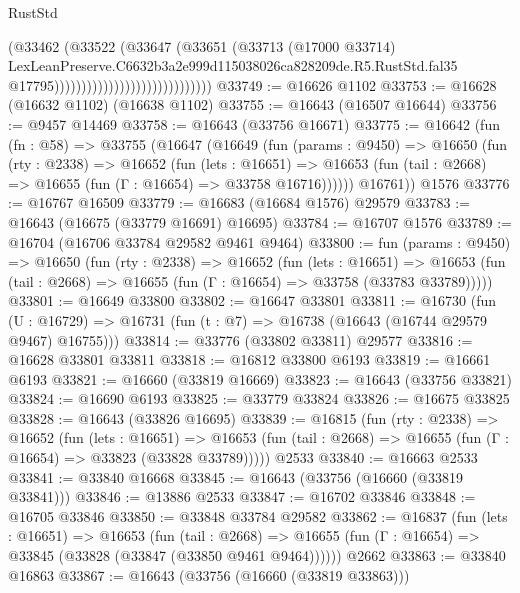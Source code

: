 \begin{lexlean}{RustStd}
\begin{coremodule}
                                                    (@33462
                                                      (@33522
                                                        (@33647
                                                          (@33651
                                                            (@33713
                                                              (@17000 @33714)
                                                              LexLeanPreserve.C6632b3a2e999d115038026ca828209de.R5.RustStd.fal35
                                                              @17795)))))))))))))))))))))))))))))
@33749 := @16626 @1102
@33753 := @16628 (@16632 @1102) (@16638 @1102)
@33755 := @16643 (@16507 @16644)
@33756 := @9457 @14469
@33758 := @16643 (@33756 @16671)
@33775 := @16642
    (fun (fn : @58) =>
    @33755
      (@16647
        (@16649
          (fun (params : @9450) =>
          @16650
            (fun (rty : @2338) =>
            @16652
              (fun (lets : @16651) =>
              @16653 (fun (tail : @2668) => @16655 (fun (Γ : @16654) => @33758 @16716))))))
        @16761))
    @1576
@33776 := @16767 @16509
@33779 := @16683 (@16684 @1576) @29579
@33783 := @16643 (@16675 (@33779 @16691) @16695)
@33784 := @16707 @1576
@33789 := @16704 (@16706 @33784 @29582 @9461 @9464)
@33800 := fun (params : @9450) =>
  @16650
    (fun (rty : @2338) =>
    @16652
      (fun (lets : @16651) =>
      @16653 (fun (tail : @2668) => @16655 (fun (Γ : @16654) => @33758 (@33783 @33789)))))
@33801 := @16649 @33800
@33802 := @16647 @33801
@33811 := @16730
    (fun (U : @16729) => @16731 (fun (t : @7) => @16738 (@16643 (@16744 @29579 @9467) @16755)))
@33814 := @33776 (@33802 @33811) @29577
@33816 := @16628 @33801 @33811
@33818 := @16812 @33800 @6193
@33819 := @16661 @6193
@33821 := @16660 (@33819 @16669)
@33823 := @16643 (@33756 @33821)
@33824 := @16690 @6193
@33825 := @33779 @33824
@33826 := @16675 @33825
@33828 := @16643 (@33826 @16695)
@33839 := @16815
    (fun (rty : @2338) =>
    @16652
      (fun (lets : @16651) =>
      @16653 (fun (tail : @2668) => @16655 (fun (Γ : @16654) => @33823 (@33828 @33789)))))
    @2533
@33840 := @16663 @2533
@33841 := @33840 @16668
@33845 := @16643 (@33756 (@16660 (@33819 @33841)))
@33846 := @13886 @2533
@33847 := @16702 @33846
@33848 := @16705 @33846
@33850 := @33848 @33784 @29582
@33862 := @16837
    (fun (lets : @16651) =>
    @16653
      (fun (tail : @2668) =>
      @16655 (fun (Γ : @16654) => @33845 (@33828 (@33847 (@33850 @9461 @9464))))))
    @2662
@33863 := @33840 @16863
@33867 := @16643 (@33756 (@16660 (@33819 @33863)))

\end{coremodule}
\end{lexlean}
